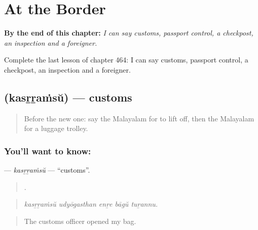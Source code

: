 
\chapter{At the Border}
\label{ch:ml-at-the-border}

\begin{chapteropening}
\textbf{By the end of this chapter:} \emph{I can say customs, passport control, a checkpost, an inspection and a foreigner.}

Complete the last lesson of chapter 464: I can say customs, passport control, a checkpost, an inspection and a foreigner.
\end{chapteropening}

\section[\texorpdfstring{\ml{കസ്റ്റംസ്} (kasṟṟaṁsŭ)}{കസ്റ്റംസ് (kasṟṟaṁsŭ)}]{ (kasṟṟaṁsŭ) — customs}

\label{lesson:ML-C464-kasrramsu}



\begin{quote}
Before the new one: say the Malayalam for to lift off, then the Malayalam for a luggage trolley.
\end{quote}

\subsection*{You'll want to know: }
\textbf{} — \emph{kasṟṟaṁsŭ} — \textquotedblleft{}customs\textquotedblright{}.

\begin{quote}
    .
\end{quote}

\begin{quote}
\emph{kasṟṟaṁsŭ udyōgasthan enṟe bāgŭ tuṟannu.}
\end{quote}

\begin{quote}
The customs officer opened my bag.
\end{quote}

